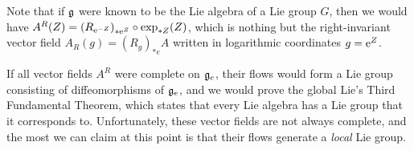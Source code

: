 \begin{rem}
    Note that if $\mathfrak{g}$ were known to be the Lie algebra of a Lie group $G$, then we would have $A^R(Z)=\left(R_{\mathrm{e}^{-Z}}\right)_{\ast \mathrm{e}^Z} \circ \exp_{\ast Z}(Z)$, which is nothing but the right-invariant vector field $A_R(g)=\left(R_g\right)_{\ast e} A$ written in logarithmic coordinates $g=\mathrm{e}^Z$.

    If all vector fields $A^R$ were complete on $\mathfrak{g}_e$, their flows would form a Lie group consisting of diffeomorphisms of $\mathfrak{g}_e$, and we would prove the global Lie's Third Fundamental Theorem, which states that every Lie algebra has a Lie group that it corresponds to. Unfortunately, these vector fields are not always complete, and the most we can claim at this point is that their flows generate a \emph{local} Lie group.
\end{rem}


